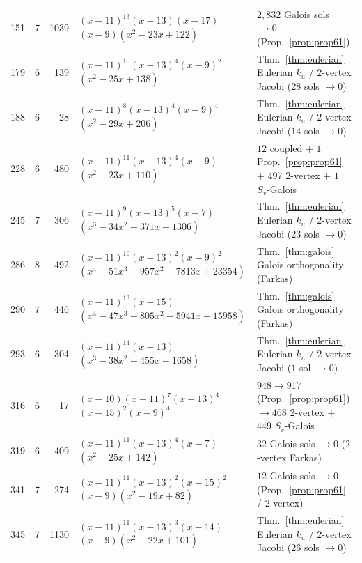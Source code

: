 \documentclass[11pt,reqno]{amsart}
\theoremstyle{definition}
\theoremstyle{remark}
\numberwithin{equation}{section}
\numberwithin{table}{section}
\begin{document}
{\begin{longtable}{@{}rrr>{\raggedright\arraybackslash}p{2.45in}>{\raggedright\arraybackslash}p{2.35in}@{}}
151 & 7 & 1039 & $(x-11)^{13}$\allowbreak $(x-13)$\allowbreak $(x-17)$\allowbreak $(x-9)$\allowbreak $(x^2-23x+122)$ & $2{,}832$ Galois sols $\to 0$ (Prop.~\ref{prop:prop61}) \\
179 & 6 & 139 & $(x-11)^{10}$\allowbreak $(x-13)^4$\allowbreak $(x-9)^2$\allowbreak $(x^2-25x+138)$ & Thm.~\ref{thm:eulerian} Eulerian $k_u$ / $2$-vertex Jacobi ($28$ sols $\to 0$) \\
188 & 6 & 28 & $(x-11)^8$\allowbreak $(x-13)^4$\allowbreak $(x-9)^4$\allowbreak $(x^2-29x+206)$ & Thm.~\ref{thm:eulerian} Eulerian $k_u$ / $2$-vertex Jacobi ($14$ sols $\to 0$) \\
228 & 6 & 480 & $(x-11)^{11}$\allowbreak $(x-13)^4$\allowbreak $(x-9)$\allowbreak $(x^2-23x+110)$ & $12$ coupled + $1$ Prop.~\ref{prop:prop61} + $497$ $2$-vertex + $1$ $S_v$-Galois \\
245 & 7 & 306 & $(x-11)^9$\allowbreak $(x-13)^5$\allowbreak $(x-7)$\allowbreak $(x^3-34x^2+371x-1306)$ & Thm.~\ref{thm:eulerian} Eulerian $k_u$ / $2$-vertex Jacobi ($23$ sols $\to 0$) \\
286 & 8 & 492 & $(x-11)^{10}$\allowbreak $(x-13)^2$\allowbreak $(x-9)^2$\allowbreak $(x^4-51x^3+957x^2-7813x+23354)$ & Thm.~\ref{thm:galois} Galois orthogonality (Farkas) \\
290 & 7 & 446 & $(x-11)^{13}$\allowbreak $(x-15)$\allowbreak $(x^4-47x^3+805x^2-5941x+15958)$ & Thm.~\ref{thm:galois} Galois orthogonality (Farkas) \\
293 & 6 & 304 & $(x-11)^{14}$\allowbreak $(x-13)$\allowbreak $(x^3-38x^2+455x-1658)$ & Thm.~\ref{thm:eulerian} Eulerian $k_u$ / $2$-vertex Jacobi ($1$ sol $\to 0$) \\
316 & 6 & 17 & $(x-10)$\allowbreak $(x-11)^7$\allowbreak $(x-13)^4$\allowbreak $(x-15)^2$\allowbreak $(x-9)^4$ & $948 \to 917$ (Prop.~\ref{prop:prop61}) $\to 468$ $2$-vertex + $449$ $S_v$-Galois \\
319 & 6 & 409 & $(x-11)^{11}$\allowbreak $(x-13)^4$\allowbreak $(x-7)$\allowbreak $(x^2-25x+142)$ & $32$ Galois sols $\to 0$ ($2$-vertex Farkas) \\
341 & 7 & 274 & $(x-11)^{11}$\allowbreak $(x-13)^2$\allowbreak $(x-15)^2$\allowbreak $(x-9)$\allowbreak $(x^2-19x+82)$ & $12$ Galois sols $\to 0$ (Prop.~\ref{prop:prop61} / $2$-vertex) \\
345 & 7 & 1130 & $(x-11)^{11}$\allowbreak $(x-13)^3$\allowbreak $(x-14)$\allowbreak $(x-9)$\allowbreak $(x^2-22x+101)$ & Thm.~\ref{thm:eulerian} Eulerian $k_u$ / $2$-vertex Jacobi ($26$ sols $\to 0$) \\

\end{longtable}}
\end{document}
